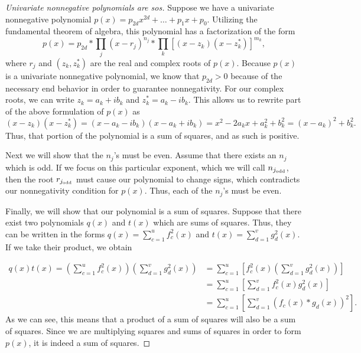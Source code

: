 	\begin{proof} [Univariate nonnegative polynomials are sos]
		Suppose we have a univariate nonnegative polynomial $p(x) = p_{2d} x^{2d} + \dots + p_{1} x + p_{0}$. Utilizing the fundamental theorem of algebra, this polynomial has a factorization of the form
		$$
		p(x) = p_{2d} * \prod_{j} (x - r_j)^{n_j} * \prod_{k} [(x - z_k)(x-z_k^*)]^{m_k},
		$$
		where $r_j$ and $(z_k, z_k^*)$ are the real and complex roots of $p(x)$. Because $p(x)$ is a univariate nonnegative polynomial, we know that $p_{2d} > 0$ because of the necessary end behavior in order to guarantee nonnegativity. For our complex roots, we can write $z_k = a_k + ib_k$ and $z_k^* = a_k - ib_k$. This allows us to rewrite part of the above formulation of $p(x)$ as 
		$$
		(x - z_k)(x -z_k^*) = (x - a_k - ib_k)(x - a_k + ib_k) = x^2 - 2a_k x + a_k^2 + b_k^2 = (x - a_k)^2 + b_k^2.
		$$
		Thus, that portion of the polynomial is a sum of squares, and as such is positive. 
		
		Next we will show that the $n_j$'s must be even. Assume that there exists an $n_j$ which is odd. If we focus on this particular exponent, which we will call $n_{j_{\textnormal{odd}}}$, then the root $r_{j_{\textnormal{odd}}}$ must cause our polynomial to change signs, which contradicts our nonnegativity condition for $p(x)$. Thus, each of the $n_j$'s must be even.
		
		Finally, we will show that our polynomial is a sum of squares. Suppose that there exist two polynomials $q(x)$ and $t(x)$ which are sums of squares. Thus, they can be written in the forms $q(x) = \sum_{c=1}^{u} f_{c}^2 (x)$ and $t(x) = \sum_{d=1}^{v} g_{d}^2 (x)$. If we take their product, we obtain 
		
		$$\begin{aligned}
		q(x)t(x) = \left(\sum_{c=1}^{u} f_{c}^2 (x)\right)\left(\sum_{d=1}^{v} g_{d}^2 (x)\right) &= \sum_{c=1}^{u} \left[f_{c}^2 (x)\left(\sum_{d=1}^{v} g_{d}^2 (x)\right)\right]\\
		&= \sum_{c=1}^{u} \left[\sum_{d=1}^{v} f_{c}^2 (x)g_{d}^2 (x)\right]\\
		&= \sum_{c=1}^{u} \left[\sum_{d=1}^{v} \left(f_{c}(x) *g_{d} (x)\right)^2\right].
		\end{aligned}$$
		As we can see, this means that a product of a sum of squares will also be a sum of squares. Since we are multiplying squares and sums of squares in order to form $p(x)$, it is indeed a sum of squares. 
	\end{proof}
	

